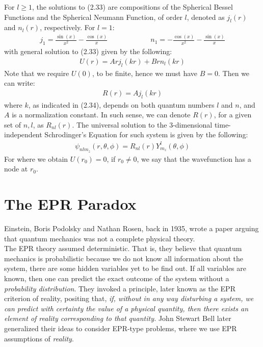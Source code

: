 \documentclass[11pt]{book}
\theoremstyle{break}
\theoremstyle{break}
\begin{document}
For $l\geq 1$, the solutions to (2.33) are compositions of the Spherical Bessel Functions and the Spherical Neumann Function, of order $l$, denoted as $j_l(r)$ and $n_l(r)$, respectively. For $l=1$:
\begin{align*}
j_1 = \frac{\sin(x)}{x^2} - \frac{\cos(x)}{x}\qquad\qquad\qquad n_1 = -\frac{\cos(x)}{x^2} - \frac{\sin(x)}{x}
\end{align*}
with general solution to (2.33) given by the following:
\begin{align*}
U(r) = Arj_l(kr) + Brn_l(kr)
\end{align*}
Note that we require $U(0)$, to be finite, hence we must have $B = 0$. Then we can write:
\begin{align*}
R(r) = Aj_l(kr)
\end{align*} 
where $k$, as indicated in (2.34), depends on both quantum numbers $l$ and $n$, and $A$ is a normalization constant. In such sense, we can denote $R(r)$, for a given set of $n,l$, as $R_{nl}(r)$. The universal solution to the $3$-dimensional time-independent Schrodinger's Equation for such system is given by the following:
\begin{align*}
\psi_{nlm_z}(r,\theta,\phi) = R_{nl}(r) Y^l_{m_z}(\theta,\phi) 
\end{align*}
For where we obtain $U(r_0) = 0$, if $r_0 \neq 0$, we say that the wavefunction has a node at $r_0$.\\

\newpage
\section[The EPR Paradox]{\color{red}The EPR Paradox\color{black}}
Einstein, Boris Podolsky and Nathan Rosen, back in 1935, wrote a paper arguing that quantum mechanics was not a complete physical theory.\\

The EPR theory assumed deterministic. That is, they believe that quantum mechanics is probabilistic because we do not know all information about the system, there are some hidden variables yet to be find out. If all variables are known, then one can predict the exact outcome of the system without a \textit{probability distribution}. They invoked a principle, later known as the EPR criterion of reality, positing that, \textit{if, without in any way disturbing a system, we can predict with certainty the value of a physical quantity, then there exists an element of reality corresponding to that quantity.} John Stewart Bell later generalized their ideas to consider EPR-type problems, where we use EPR assumptions of \textit{reality}. \\
\end{document}
